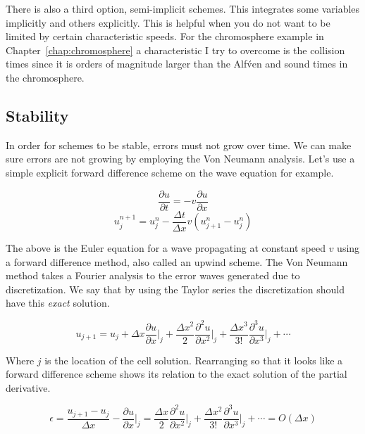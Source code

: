 \documentclass[12pt,upcase]{umlthesis}
\begin{document}
There is also a third option, semi-implicit schemes. This integrates some variables implicitly and others explicitly. This is helpful when you do not want to be limited by certain characteristic speeds. For the chromosphere example in Chapter~\ref{chap:chromosphere} a characteristic I try to overcome is the collision times since it is orders of magnitude larger than the Alf\'ven and sound times in the chromosphere.

\subsection{Stability}\label{sec:stability}

In order for schemes to be stable, errors must not grow over time. We can make sure errors are not growing by employing the Von Neumann analysis. Let's use a simple explicit forward difference scheme on the wave equation for example.

\begin{equation}
	\frac{\partial u}{\partial t} = -v\frac{\partial u}{\partial x}
\end{equation}
\begin{equation}\label{eq:upwind}
	u^{n+1}_j = u^n_j - \frac{\Delta t}{\Delta x}v(u^n_{j+1}-u^n_{j})
\end{equation}

The above is the Euler equation for a wave propagating at constant speed $v$ using a forward difference method, also called an upwind scheme. The Von Neumann method takes a Fourier analysis to the error waves generated due to discretization. We say that by using the Taylor series the discretization should have this {\it exact\/} solution.

\begin{equation}
	u_{j+1} = u_j + \Delta x {\frac{\partial u}{\partial x}}\rvert_j + \frac{\Delta x^2}{2} {\frac{\partial^2 u}{\partial x^2}}\rvert_j + \frac{\Delta x^3}{3!} {\frac{\partial^3 u}{\partial x^3}}\rvert_j + \cdots 
\end{equation}

Where $j$ is the location of the cell solution. Rearranging so that it looks like a forward difference scheme shows its relation to the exact solution of the partial derivative.

\begin{equation}
	\epsilon = \frac{u_{j+1} - u_j}{\Delta x} - {\frac{\partial u}{\partial x}}\rvert_j =  \frac{\Delta x}{2} {\frac{\partial^2 u}{\partial x^2}}\rvert_j + \frac{\Delta x^2}{3!} {\frac{\partial^3 u}{\partial x^3}}\rvert_j + \cdots = O(\Delta x)
\end{equation}
\end{document}
